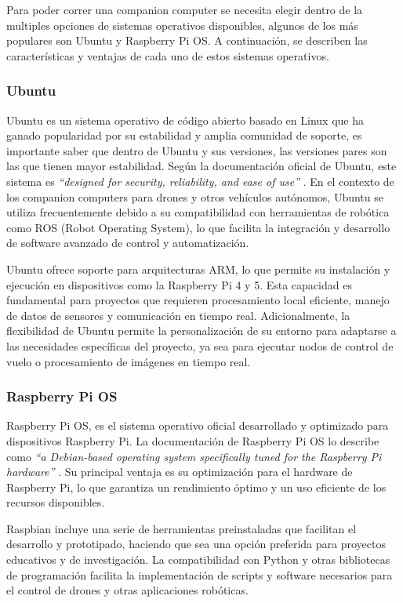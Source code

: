     Para poder correr una companion computer se necesita elegir dentro de la multiples opciones de sistemas operativos disponibles, algunos de los más populares son Ubuntu y Raspberry Pi OS. A continuación, se describen las características y ventajas de cada uno de estos sistemas operativos.

    \subsubsection{Ubuntu}

    Ubuntu es un sistema operativo de código abierto basado en Linux que ha ganado popularidad por su estabilidad y amplia comunidad de soporte, es importante saber que dentro de Ubuntu y sus versiones, las versiones pares son las que tienen mayor estabilidad. Según la documentación oficial de Ubuntu, este sistema es \textit{“designed for security, reliability, and ease of use”} \cite{ubuntu_docs}. En el contexto de los companion computers para drones y otros vehículos autónomos, Ubuntu se utiliza frecuentemente debido a su compatibilidad con herramientas de robótica como ROS (Robot Operating System), lo que facilita la integración y desarrollo de software avanzado de control y automatización.

    Ubuntu ofrece soporte para arquitecturas ARM, lo que permite su instalación y ejecución en dispositivos como la Raspberry Pi 4 y 5. Esta capacidad es fundamental para proyectos que requieren procesamiento local eficiente, manejo de datos de sensores y comunicación en tiempo real. Adicionalmente, la flexibilidad de Ubuntu permite la personalización de su entorno para adaptarse a las necesidades específicas del proyecto, ya sea para ejecutar nodos de control de vuelo o procesamiento de imágenes en tiempo real.


    \subsubsection{Raspberry Pi OS}

    Raspberry Pi OS, es el sistema operativo oficial desarrollado y optimizado para dispositivos Raspberry Pi. La documentación de Raspberry Pi OS lo describe como \textit{“a Debian-based operating system specifically tuned for the Raspberry Pi hardware”} \cite{raspbian_docs}. Su principal ventaja es su optimización para el hardware de Raspberry Pi, lo que garantiza un rendimiento óptimo y un uso eficiente de los recursos disponibles.

    Raspbian incluye una serie de herramientas preinstaladas que facilitan el desarrollo y prototipado, haciendo que sea una opción preferida para proyectos educativos y de investigación. La compatibilidad con Python y otras bibliotecas de programación facilita la implementación de scripts y software necesarios para el control de drones y otras aplicaciones robóticas.

